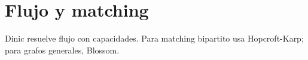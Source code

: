 \section{Flujo y matching}\label{sec:flujo}

Dinic resuelve flujo con capacidades. Para matching bipartito usa
Hopcroft-Karp; para grafos generales, Blossom.




